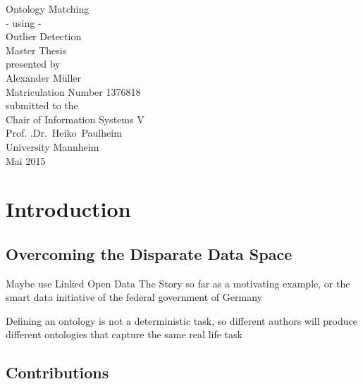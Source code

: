 \documentclass[11pt,titlepage,oneside,openany,a4paper]{report}
\begin{document}
\begin{titlepage}
	\vspace*{2cm}
  \begin{center}
   {\Large Ontology Matching \\}
   {\Large - using  -\\}
   {\Large Outlier Detection  \\}
   \vspace{2cm}
   {Master Thesis\\}
   \vspace{2cm}
   {presented by\\
 	 Alexander Müller \\
    Matriculation Number 1376818\\
   }
   \vspace{1cm}
   {submitted to the\\
  	Chair of Information Systems V\\
  	 Prof. .Dr.\ Heiko\ Paulheim \\
    University Mannheim\\} \vspace{2cm}
   {Mai 2015}
  \end{center}
\end{titlepage}
\tableofcontents
\newpage

\listoffigures

\listoftables

\newpage
{}
\chapter{Introduction}
	\section{Overcoming the Disparate Data Space}
	Maybe use Linked Open Data The Story so far as a motivating example, or the smart data initiative of the federal government of Germany
	
	Defining an ontology is not a deterministic task, so different authors will produce different ontologies that capture the same real life task
	\section{Contributions}
\end{document}
